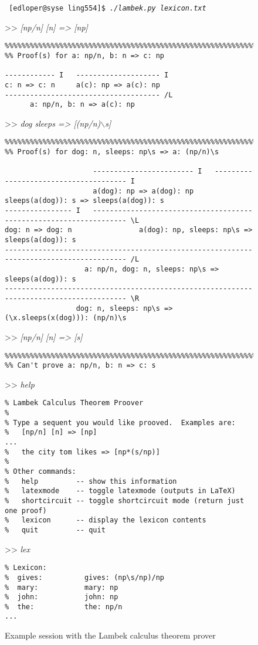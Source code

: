 \documentclass[11pt]{article}
\begin{document}
\begin{figure}
\noindent
\begin{boxedminipage}{\textwidth}
{\footnotesize \tt
[edloper@syse ling554]\$ \textit{./lambek.py lexicon.txt}
\vspace{3mm}

>> \textit{[np/n] [n] => [np]}

\begin{verbatim}
%%%%%%%%%%%%%%%%%%%%%%%%%%%%%%%%%%%%%%%%%%%%%%%%%%%%%%%%%%%%
%% Proof(s) for a: np/n, b: n => c: np

------------ I   -------------------- I
c: n => c: n     a(c): np => a(c): np
------------------------------------- /L
      a: np/n, b: n => a(c): np
\end{verbatim}

>> \textit{dog sleeps => [(np/n)$\backslash$s]}

\begin{verbatim}
%%%%%%%%%%%%%%%%%%%%%%%%%%%%%%%%%%%%%%%%%%%%%%%%%%%%%%%%%%%%
%% Proof(s) for dog: n, sleeps: np\s => a: (np/n)\s

                     ------------------------ I   -------------------------------------- I
                     a(dog): np => a(dog): np     sleeps(a(dog)): s => sleeps(a(dog)): s
---------------- I   ------------------------------------------------------------------- \L
dog: n => dog: n                a(dog): np, sleeps: np\s => sleeps(a(dog)): s
---------------------------------------------------------------------------------------- /L
                   a: np/n, dog: n, sleeps: np\s => sleeps(a(dog)): s
---------------------------------------------------------------------------------------- \R
                 dog: n, sleeps: np\s => (\x.sleeps(x(dog))): (np/n)\s
\end{verbatim}

>> \textit{[np/n] [n] => [s]}

\begin{verbatim}
%%%%%%%%%%%%%%%%%%%%%%%%%%%%%%%%%%%%%%%%%%%%%%%%%%%%%%%%%%%%
%% Can't prove a: np/n, b: n => c: s
\end{verbatim}

>> \textit{help}

\begin{verbatim}
% Lambek Calculus Theorem Proover
%
% Type a sequent you would like prooved.  Examples are:
%   [np/n] [n] => [np]
...
%   the city tom likes => [np*(s/np)]
%
% Other commands:
%   help         -- show this information
%   latexmode    -- toggle latexmode (outputs in LaTeX)
%   shortcircuit -- toggle shortcircuit mode (return just one proof)
%   lexicon      -- display the lexicon contents
%   quit         -- quit
\end{verbatim}
>> \textit{lex}
\begin{verbatim}
% Lexicon: 
%  gives:          gives: (np\s/np)/np
%  mary:           mary: np
%  john:           john: np
%  the:            the: np/n
...
\end{verbatim}}
\end{boxedminipage}
\caption{Example session with the Lambek calculus theorem prover}
\label{fig:session}
\end{figure}
\end{document}
